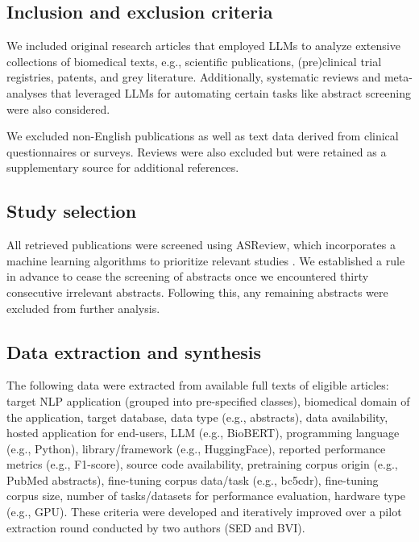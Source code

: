 \documentclass[fleqn,10pt]{olplainarticle}
\begin{document}
\subsection*{Inclusion and exclusion criteria}

We included original research articles that employed LLMs to analyze extensive collections of biomedical texts, e.g., scientific publications, (pre)clinical trial registries, patents, and grey literature. Additionally, systematic reviews and meta-analyses that leveraged LLMs for automating certain tasks like abstract screening were also considered.

We excluded non-English publications as well as text data derived from clinical questionnaires or surveys. Reviews were also excluded but were retained as a supplementary source for additional references.

\subsection*{Study selection}

All retrieved publications were screened using ASReview,  which incorporates a machine learning algorithms to prioritize relevant studies \citep{van2021open}. We established a rule in advance to cease the screening of abstracts once we encountered thirty consecutive irrelevant abstracts. Following this, any remaining abstracts were excluded from further analysis.

\subsection*{Data extraction and synthesis}
The following data were extracted from available full texts of eligible articles: target NLP application (grouped into pre-specified classes), biomedical domain of the application, target database, data type (e.g., abstracts), data availability, hosted application for end-users, LLM (e.g., BioBERT), programming language (e.g., Python), library/framework (e.g., HuggingFace), reported performance metrics (e.g., F1-score), source code availability, pretraining corpus origin (e.g., PubMed abstracts), fine-tuning corpus data/task (e.g., bc5cdr), fine-tuning corpus size, number of tasks/datasets for performance evaluation, hardware type (e.g., GPU). These criteria were developed and iteratively improved over a pilot extraction round conducted by two authors (SED and BVI). %
\end{document}
